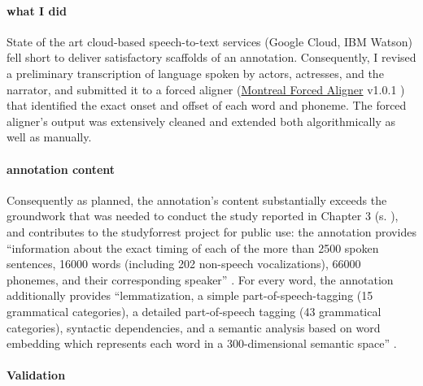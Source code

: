 \paragraph{what I did}
State of the art cloud-based speech-to-text services (Google Cloud, IBM Watson)
fell short to deliver satisfactory scaffolds of an annotation.
Consequently, I revised a preliminary transcription of language spoken by
actors, actresses, and the narrator, and submitted it to a forced aligner
(\href{https://github.com/MontrealCorpusTools/Montreal-Forced-Aligner}{Montreal
Forced Aligner} v1.0.1 \citep{mcauliffe2017montreal}) that identified the exact
onset and offset of each word and phoneme. The forced aligner's output was
extensively cleaned and extended both algorithmically as well as manually.


\paragraph{annotation content}
%
Consequently as planned, the annotation's content substantially exceeds the
groundwork that was needed to conduct the study reported in Chapter 3 (s.
\citep{haeusler2022processing}), and contributes to the studyforrest project for
public use:
the annotation provides ``information about the exact timing of each of the more
than 2500 spoken sentences, 16000 words (including 202 non-speech
vocalizations), 66000 phonemes, and their corresponding speaker''
\citep{haeusler2021speechanno}.
%
For every word, the annotation additionally provides ``lemmatization, a simple
part-of-speech-tagging (15 grammatical categories), a detailed part-of-speech
tagging (43 grammatical categories), syntactic dependencies, and a semantic
analysis based on word embedding which represents each word in a 300-dimensional
semantic space'' \citep{haeusler2021speechanno}.


\paragraph{Validation}

